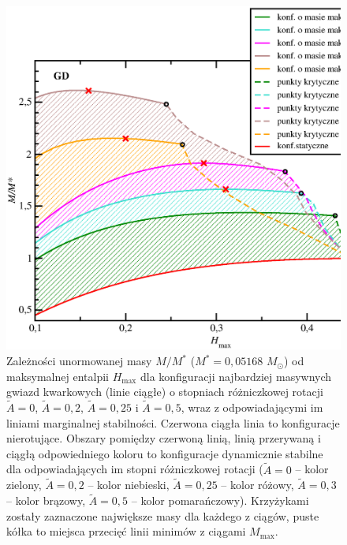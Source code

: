 \documentclass{bachelor_thesis}
\begin{document}
            \begin{figure}[h!]
            \centering
            \includegraphics[scale=.52]{figures/RysLinesSQS.eps}
            \caption{Zależności unormowanej masy $M/M^*$ ($M^*=0,05168$ $M_\odot$) od maksymalnej entalpii $H_\textrm{max}$ dla konfiguracji najbardziej masywnych gwiazd kwarkowych (linie ciągłe) o stopniach różniczkowej rotacji $\tilde{A}=0$, $\tilde{A}=0,2$, $\tilde{A}=0,25$ i $\tilde{A}=0,5$, wraz z odpowiadającymi im liniami marginalnej stabilności. Czerwona ciągła linia to konfiguracje nierotujące. Obszary pomiędzy czerwoną linią, linią przerywaną i ciągłą odpowiedniego koloru to konfiguracje dynamicznie stabilne dla odpowiadających im stopni różniczkowej rotacji ($\tilde{A}=0$ -- kolor zielony, $\tilde{A}=0,2$ -- kolor niebieski, $\tilde{A}=0,25$ -- kolor różowy, $\tilde{A}=0,3$ -- kolor brązowy, $\tilde{A}=0,5$ -- kolor pomarańczowy). Krzyżykami zostały zaznaczone największe masy dla każdego z ciągów, puste kółka to miejsca przecięć linii minimów z ciągami $M_\textrm{max}$.}
            \label{RysLinesSQS}
            \end{figure}\\
\end{document}
